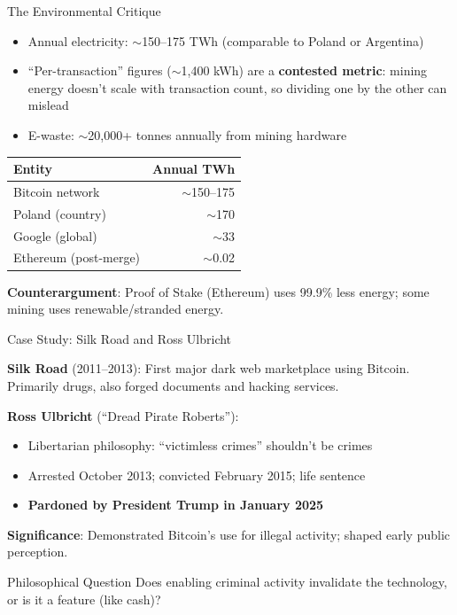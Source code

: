 ﻿\documentclass[aspectratio=169,11pt]{beamer}
\begin{document}
\begin{frame}{The Environmental Critique}
\begin{objectionbox}
\small
\begin{itemize}
    \item Annual electricity: $\sim$150--175 TWh (comparable to Poland or Argentina)
    \item ``Per-transaction'' figures ($\sim$1,400 kWh) are a \textbf{contested metric}: mining energy doesn't scale with transaction count, so dividing one by the other can mislead
    \item E-waste: $\sim$20,000+ tonnes annually from mining hardware
\end{itemize}
\end{objectionbox}

\vspace{-0.2em}
\begin{table}[h]
\centering
\scriptsize
\begin{tabular}{@{}lr@{}}
\toprule
\textbf{Entity} & \textbf{Annual TWh} \\
\midrule
Bitcoin network & $\sim$150--175 \\
Poland (country) & $\sim$170 \\
Google (global) & $\sim$33 \\
Ethereum (post-merge) & $\sim$0.02 \\
\bottomrule
\end{tabular}
\end{table}
\vspace{-0.3em}
\textbf{Counterargument}: Proof of Stake (Ethereum) uses 99.9\% less energy; some mining uses renewable/stranded energy.
\end{frame}

\begin{frame}{Case Study: Silk Road and Ross Ulbricht}
\begin{casestudybox}
\small
\textbf{Silk Road} (2011--2013): First major dark web marketplace using Bitcoin. Primarily drugs, also forged documents and hacking services.
\end{casestudybox}

\vspace{0.2em}
\textbf{Ross Ulbricht} (``Dread Pirate Roberts''):
\begin{itemize}
    \item Libertarian philosophy: ``victimless crimes'' shouldn't be crimes
    \item Arrested October 2013; convicted February 2015; life sentence
    \item \textbf{Pardoned by President Trump in January 2025}
\end{itemize}

\textbf{Significance}: Demonstrated Bitcoin's use for illegal activity; shaped early public perception.

\begin{alertblock}{Philosophical Question}
Does enabling criminal activity invalidate the technology, or is it a feature (like cash)?
\end{alertblock}
\end{frame}
\end{document}
